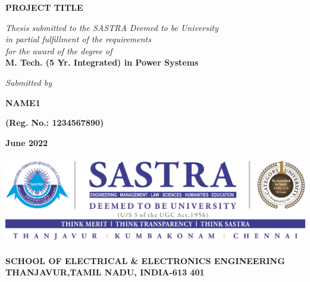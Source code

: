 \documentclass[a4paper, 12pt, oneside]{sastra}
\begin{document}
\onehalfspacing
	
	\thispagestyle{empty}
	\begin{center}
		\Large{\textbf{PROJECT TITLE}}
	\end{center}
	\bigskip{}
	\bigskip{}
	\bigskip{}
	\begin{center}
		\textit{Thesis submitted to the SASTRA Deemed to be University\\ 
			in partial fulfillment of the requirements\\
			for the award of the degree of\\
		}
		\bigskip{}
		\bigskip{}
		\large{\textbf{M. Tech. (5 Yr. Integrated) in Power Systems}}
		\bigskip{}
		\bigskip{}
		\bigskip{}
		\bigskip{}
		\bigskip{}
		\bigskip{}
	\end{center}
	\begin{center}
		\textit{Submitted by}\\
	\end{center}
	\begin{center}
		\begin{singlespacing}
				\textbf{\Large{NAME1}}
			
			\textbf{\large{(Reg. No.: 1234567890)}}
		
		\end{singlespacing}
	\end{center}
	\bigskip{}
	
	\begin{center}
		\Large{\textbf{June 2022}}   %
	\end{center}
	\bigskip{}
	\begin{center}
		\includegraphics[height=1.52in, width=5.65in]{sastra_logo_updated}
	\end{center}
	
	\begin{center}
		\large{\textbf{SCHOOL OF ELECTRICAL \& ELECTRONICS ENGINEERING}} %
		{\textbf{THANJAVUR,TAMIL NADU, INDIA-613 401}}
	\end{center}
	
\end{document}
